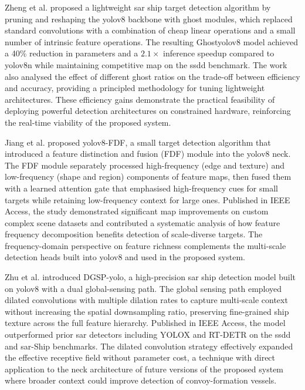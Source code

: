 Zheng et al. \cite{Zheng2024} proposed a lightweight \gls{sar} ship target detection
algorithm by pruning and reshaping the \gls{yolov8} backbone with ghost modules, which
replaced standard convolutions with a combination of cheap linear operations and
a small number of intrinsic feature operations. The resulting Ghost\gls{yolov8} model
achieved a 40\% reduction in parameters and a $2.1\times$ inference speedup
compared to \gls{yolov8}n while maintaining competitive \gls{map} on the \gls{ssdd} benchmark.
The work also analysed the effect of different ghost ratios on the trade-off
between efficiency and accuracy, providing a principled methodology for tuning
lightweight architectures. These efficiency gains demonstrate the practical
feasibility of deploying powerful detection architectures on constrained hardware,
reinforcing the real-time viability of the proposed system.
 
Jiang et al. \cite{Jiang2024} proposed \gls{yolov8}-FDF, a small target detection
algorithm that introduced a feature distinction and fusion (FDF) module into the
\gls{yolov8} neck. The FDF module separately processed high-frequency (edge and texture)
and low-frequency (shape and region) components of feature maps, then fused them
with a learned attention gate that emphasised high-frequency cues for small
targets while retaining low-frequency context for large ones. Published in IEEE
Access, the study demonstrated significant \gls{map} improvements on custom complex
scene datasets and contributed a systematic analysis of how feature frequency
decomposition benefits detection of scale-diverse targets. The frequency-domain
perspective on feature richness complements the multi-scale detection heads
built into \gls{yolov8} and used in the proposed system.
 
Zhu et al. \cite{Lejun2024} introduced DGSP-\gls{yolo}, a high-precision \gls{sar} ship
detection model built on \gls{yolov8} with a dual global-sensing path. The global
sensing path employed dilated convolutions with multiple dilation rates to
capture multi-scale context without increasing the spatial downsampling ratio,
preserving fine-grained ship texture across the full feature hierarchy.
Published in IEEE Access, the model outperformed prior \gls{sar} detectors including
YOLOX and RT-DETR on the \gls{ssdd} and \gls{sar}-Ship benchmarks. The dilated convolution
strategy effectively expanded the effective receptive field without parameter
cost, a technique with direct application to the neck architecture of future
versions of the proposed system where broader context could improve detection
of convoy-formation vessels.
 
